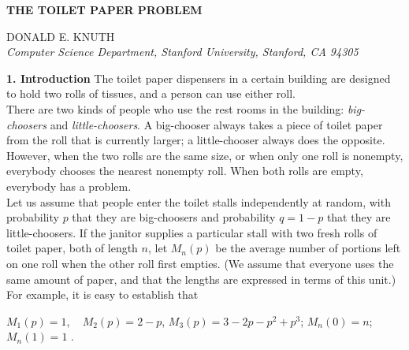 \documentclass[10pt]{article}
\begin{document}
\begin{center}

\textbf{\large THE TOILET PAPER PROBLEM} \\ 
 
\hspace{0.1in}

DONALD E. KNUTH \\

\textit{Computer Science Department, Stanford University, Stanford, CA 94305} \\

\end{center}

\label{1. Introduction}
\textbf{1. Introduction } The toilet paper dispensers in a certain building are designed to hold two rolls 
of tissues, and a person can use either roll. \\
\indent There are two kinds of people who use the rest rooms in the building: \textit{big-choosers} and \textit{little-choosers}. 
A big-chooser always takes a piece of toilet paper from the roll that is currently larger; a little-chooser 
always does the opposite. However, when the two rolls are the same size, or when only one roll is 
nonempty, everybody chooses the nearest nonempty roll. When both rolls are empty, everybody has a 
problem. \\
\indent Let us assume that people enter the toilet stalls independently at random, with probability $p$
that 
they are big-choosers and probability $q = 1 - p$ that they are little-choosers. If the janitor
supplies 
a particular stall with two fresh rolls of toilet paper, both of length $n$, let $M_n \! \left( p \right)$ be
the average number of portions left on one roll when the other roll first empties. (We assume that 
everyone uses the same amount of paper, and that the lengths are expressed in terms of this unit.) 
For example, it is easy to establish that \\

\begin{center}
$M_1 \left(  p \right) = 1$,  \mbox{ } $M_{2} \left(  p \right) = 2 - p$,  $M_{3} \left(  p \right) = 3 - 2p - p^{2} + p^{3}$; 
$M_{n} \left(  0 \right) = n$; \mbox{  }  $M_{n} \left( 1 \right) = 1$ .
\end{center}
\end{document}
